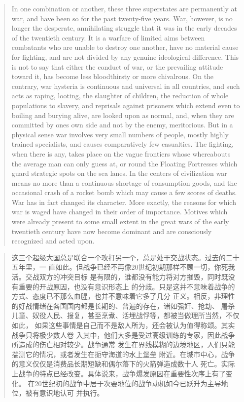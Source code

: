 \begin{paracol}{2}
\begin{quotation}
In one combination or another, these three superstates are permanently
at war, and have been so for the past twenty-five years. War, however,
is no longer the desperate, annihilating struggle that it was in the
early decades of the twentieth century. It is a warfare of limited aims
between combatants who are unable to destroy one another, have no
material cause for fighting, and are not divided by any genuine
ideological difference. This is not to say that either the conduct of
war, or the prevailing attitude toward it, has become less bloodthirsty
or more chivalrous. On the contrary, war hysteria is continuous and
universal in all countries, and such acts as raping, looting, the
slaughter of children, the reduction of whole populations to slavery,
and reprisals against prisoners which extend even to boiling and burying
alive, are looked upon as normal, and, when they are committed by
one\textquotesingle s own side and not by the enemy, meritorious. But in
a physical sense war involves very small numbers of people, mostly
highly trained specialists, and causes comparatively few casualties. The
fighting, when there is any, takes place on the vague frontiers whose
whereabouts the average man can only guess at, or round the Floating
Fortresses which guard strategic spots on the sea lanes. In the centers
of civilization war means no more than a continuous shortage of
consumption goods, and the occasional crash of a rocket bomb which may
cause a few scores of deaths. War has in fact changed its character.
More exactly, the reasons for which war is waged have changed in their
order of importance. Motives which were already present to some small
extent in the great wars of the early twentieth century have now become
dominant and are consciously recognized and acted upon.
\end{quotation}

\switchcolumn

\begin{quotation}
这三个超级大国总是联合一个攻打另一个，总是处于交战状态。过去的二十五年里，一
直如此。但战争已经不再像20世纪初期那样不顾一切，你死我活。交战双方的冲突目标
是有限的，谁都没有能力将对方摧毁，同时既没有重要的开战原因，也没有意识形态上
的分歧。只是这并不意味着战争的方式、态度已不那么血腥，也并不意味着它多了几分
正义。相反，非理性的好战情绪在各国国内都是长期的、普遍的存在，诸如强奸、抢劫、
屠杀儿童、奴役人民、报复，甚至烹煮、活埋战俘等，都被当做理所当然，不仅如此，
如果这些事情是自己而不是敌人所为，还会被认为值得称颂。其实战争只将极少数人卷
入其中，他们大多是受过高级训练的专家，因此战争所造成的伤亡相对较少。战争通常
发生在界线模糊的边境地区，人们只能揣测它的情况，或者发生在扼守海道的水上堡垒
附近。在城市中心，战争的意义仅仅是消费品长期短缺和偶尔落下的火箭弹造成数十人
死亡。实际上战争的特点已经改变。具体说来，战争爆发原因在重要性次序上有了变化。
在20世纪初的战争中居于次要地位的战争动机如今已跃升为主导地位，被有意识地认可
并执行。
\end{quotation}


\end{paracol}
